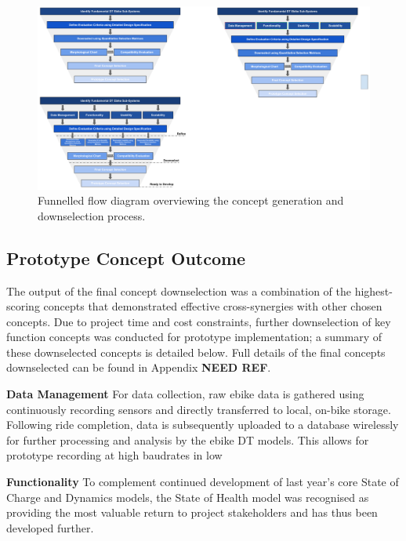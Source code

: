 \documentclass[a4paper, 10pt]{article}
\numberwithin{equation}{section}
\begin{document}
\begin{figure}[H]
    \centering
    \includegraphics[width=1\linewidth]{images/Concept_Gen/Concept_Gen_Process_2.pdf}
    \caption{Funnelled flow diagram overviewing the concept generation and downselection process.}
    \label{fig:congen}
\end{figure}

\subsection{Prototype Concept Outcome}
The output of the final concept downselection was a combination of the highest-scoring concepts that demonstrated effective cross-synergies with other chosen concepts. Due to project time and cost constraints, further downselection of key function concepts was conducted for prototype implementation; a summary of these downselected concepts is detailed below. Full details of the final concepts downselected can be found in Appendix \textbf{NEED REF}.
\vspace{0.5em}

\textbf{Data Management} \newline
For data collection, raw ebike data is gathered using continuously recording sensors and directly transferred to local, on-bike storage. Following ride completion, data is subsequently uploaded to a database wirelessly for further processing and analysis by the ebike DT models. This allows for prototype recording at high baudrates in low 
\vspace{0.5em}

\textbf{Functionality}\newline
To complement continued development of last year's core State of Charge and Dynamics models, the State of Health model was recognised as providing the most valuable return to project stakeholders and has thus been developed further.
\vspace{0.5em}
\end{document}
